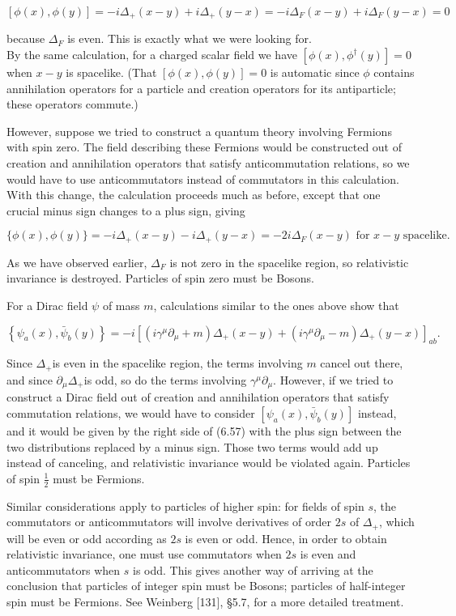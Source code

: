 \documentclass[10pt, letterpaper]{article}
\begin{document}
$$
[\phi(x), \phi(y)]=-i \Delta_{+}(x-y)+i \Delta_{+}(y-x)=-i \Delta_{F}(x-y)+i \Delta_{F}(y-x)=0
$$

because $\Delta_{F}$ is even. This is exactly what we were looking for.\\
By the same calculation, for a charged scalar field we have $\left[\phi(x), \phi^{\dagger}(y)\right]=0$ when $x-y$ is spacelike. (That $[\phi(x), \phi(y)]=0$ is automatic since $\phi$ contains annihilation operators for a particle and creation operators for its antiparticle; these operators commute.)

However, suppose we tried to construct a quantum theory involving Fermions with spin zero. The field describing these Fermions would be constructed out of creation and annihilation operators that satisfy anticommutation relations, so we would have to use anticommutators instead of commutators in this calculation. With this change, the calculation proceeds much as before, except that one crucial minus sign changes to a plus sign, giving

$$
\{\phi(x), \phi(y)\}=-i \Delta_{+}(x-y)-i \Delta_{+}(y-x)=-2 i \Delta_{F}(x-y) \text { for } x-y \text { spacelike. }
$$

As we have observed earlier, $\Delta_{F}$ is not zero in the spacelike region, so relativistic invariance is destroyed. Particles of spin zero must be Bosons.

For a Dirac field $\psi$ of mass $m$, calculations similar to the ones above show that

$$
\left\{\psi_{a}(x), \bar{\psi}_{b}(y)\right\}=-i\left[\left(i \gamma^{\mu} \partial_{\mu}+m\right) \Delta_{+}(x-y)+\left(i \gamma^{\mu} \partial_{\mu}-m\right) \Delta_{+}(y-x)\right]_{a b} .
$$

Since $\Delta_{+}$is even in the spacelike region, the terms involving $m$ cancel out there, and since $\partial_{\mu} \Delta_{+}$is odd, so do the terms involving $\gamma^{\mu} \partial_{\mu}$. However, if we tried to construct a Dirac field out of creation and annihilation operators that satisfy commutation relations, we would have to consider $\left[\psi_{a}(x), \bar{\psi}_{b}(y)\right]$ instead, and it would be given by the right side of (6.57) with the plus sign between the two distributions replaced by a minus sign. Those two terms would add up instead of canceling, and relativistic invariance would be violated again. Particles of spin $\frac{1}{2}$ must be Fermions.

Similar considerations apply to particles of higher spin: for fields of spin $s$, the commutators or anticommutators will involve derivatives of order $2 s$ of $\Delta_{+}$, which will be even or odd according as $2 s$ is even or odd. Hence, in order to obtain relativistic invariance, one must use commutators when $2 s$ is even and anticommutators when $s$ is odd. This gives another way of arriving at the conclusion that particles of integer spin must be Bosons; particles of half-integer spin must be Fermions. See Weinberg [131], §5.7, for a more detailed treatment.
\end{document}
